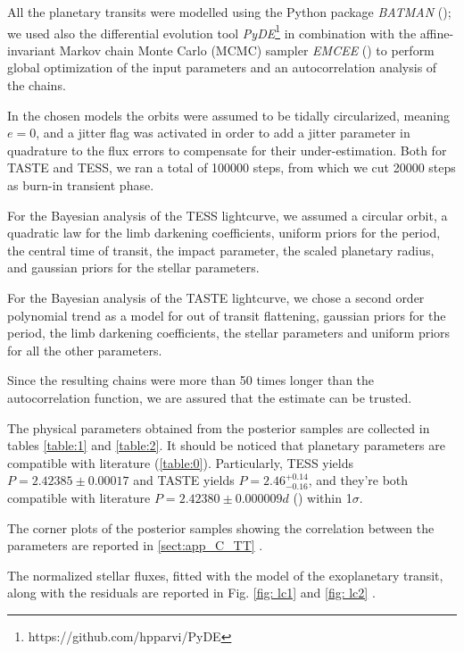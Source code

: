 \documentclass[a4paper,11pt,twocolumn]{article}
\begin{document}
All the planetary transits were modelled using the Python package 
\textit{BATMAN} (\cite{Kreidberg}); we used also the differential 
evolution tool \textit{PyDE}\footnote{https://github.com/hpparvi/PyDE} 
in combination with the affine-invariant Markov chain Monte Carlo (MCMC) 
sampler \textit{EMCEE} (\cite{Foreman}) to perform global optimization 
of the input parameters and an autocorrelation analysis of the chains.

In the chosen models the orbits were assumed to be tidally circularized, 
meaning $e=0$, and a jitter flag was activated in order to add a jitter 
parameter in quadrature to the flux errors to compensate for their 
under-estimation. Both for TASTE and TESS, we ran a total of 100000 steps, 
from which we cut 20000 steps as burn-in transient phase.

For the Bayesian analysis of the TESS lightcurve, we assumed a circular 
orbit, a quadratic law for the limb darkening coefficients, uniform priors 
for the period, the central time of transit, the impact parameter, 
the scaled planetary radius, and gaussian priors for the stellar parameters.

For the Bayesian analysis of the TASTE lightcurve, we chose a second order 
polynomial trend as a model for out of transit flattening, gaussian 
priors for the period, the limb darkening coefficients, the stellar 
parameters and uniform priors for all the other parameters.

Since the resulting chains were more than 50 times longer than the 
autocorrelation function, we are assured that the estimate can be trusted.

The physical parameters obtained from the posterior 
samples are collected in tables \ref{table:1} and \ref{table:2}. It should 
be noticed that planetary parameters are compatible with literature 
(\ref{table:0}). Particularly, TESS yields $P=2.42385\pm0.00017$
and TASTE yields $P=2.46^{+0.14}_{-0.16}$, and they're both compatible 
with literature $P=2.42380\pm0.000009 d$ (\cite{Anderson}) within 1$\sigma$.

The corner plots of the posterior samples showing the correlation between 
the parameters are reported in \ref{sect:app_C_TT} .


The normalized stellar fluxes, fitted with the model of the exoplanetary 
transit, along with the residuals are reported in Fig. \ref{fig: lc1} 
and \ref{fig: lc2} .
\end{document}
